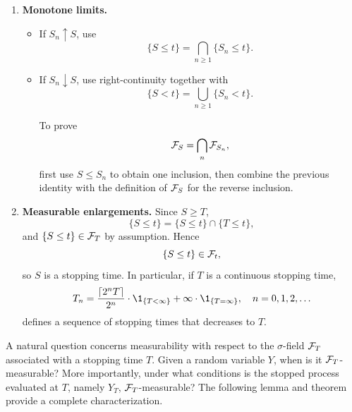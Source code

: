 \documentclass[../Main.tex]{subfiles}
\begin{document}
{\begin{enumerate}
    \item \textbf{Monotone limits.}
    \begin{itemize}
        \item If $S_n\uparrow S$, use
        \[ \{S\le t\} = \bigcap_{n\ge1}\{S_n\le t\}. \]

        \item If $S_n\downarrow S$, use right-continuity together with
        \[ \{S<t\} = \bigcup_{n\ge1}\{S_n<t\}. \]

        To prove \[ \mathcal{F}_S = \bigcap_n\mathcal{F}_{S_n}, \]
        first use $S\le S_n$ to obtain one inclusion, then combine the previous identity with the definition of $\mathcal{F}_S$ for the reverse inclusion.
    \end{itemize}

    \item \textbf{Measurable enlargements.}
    Since $S\ge T$,
    \[ \{S\le t\} = \{S\le t\}\cap\{T\le t\}, \]
    and $\{S\le t\}\in\mathcal{F}_T$ by assumption. Hence
    \[ \{S\le t\}\in\mathcal{F}_t, \]
    so $S$ is a stopping time. In particular, if $T$ is a continuous stopping time, \[ T_n= \frac{\lceil 2^n T \rceil}{2^n}\cdot \1_{\{T<\infty\}}+\infty \cdot \1_{\{T=\infty\}}, \quad n=0,1,2, \ldots \] defines a sequence of stopping times that decreases to $T$.
\end{enumerate}
}

A natural question concerns measurability with respect to the $\sigma$-field $\mathcal{F}_T$ associated with a stopping time $T$. Given a random variable $Y$, when is it $\mathcal{F}_T$-measurable? More importantly, under what conditions is the stopped process evaluated at $T$, namely $Y_T$, $\mathcal{F}_T$-measurable? The following lemma and theorem provide a complete characterization.
\end{document}
